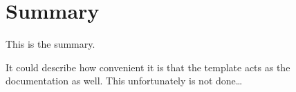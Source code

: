 \chapter*{Summary}
This is the summary.

It could describe how convenient it is that the template acts as the
documentation as well. This unfortunately is not done\ldots
